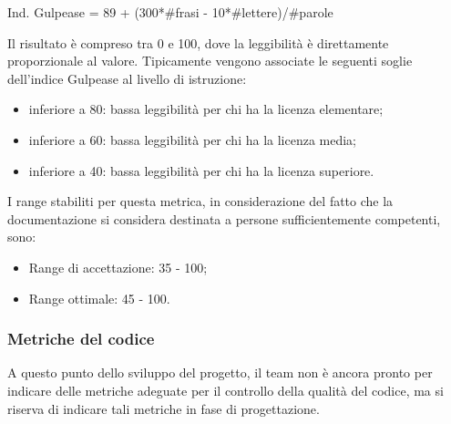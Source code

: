 			Ind. Gulpease = 89 + (300*\#frasi - 10*\#lettere)/\#parole
			
		Il risultato è compreso tra 0 e 100, dove la leggibilità è direttamente proporzionale al valore.
		Tipicamente vengono associate le seguenti soglie dell'indice Gulpease al livello di istruzione:
		\begin{itemize}
			\item inferiore a 80: bassa leggibilità per chi ha la licenza elementare;
			\item inferiore a 60: bassa leggibilità per chi ha la licenza media;
			\item inferiore a 40: bassa leggibilità per chi ha la licenza superiore.
		\end{itemize}
		
		I range stabiliti per questa metrica, in considerazione del fatto che la documentazione si considera destinata a persone sufficientemente competenti, sono:
		\begin{itemize}
			\item Range di accettazione: 35 - 100;
			\item Range ottimale: 45 - 100.
		\end{itemize}
	\subsubsection{Metriche del codice}
		A questo punto dello sviluppo del progetto, il team non è ancora pronto per indicare delle metriche adeguate per il controllo della qualità del codice, ma si riserva di indicare tali metriche in fase di progettazione.